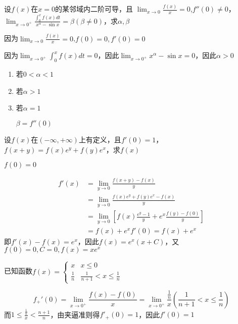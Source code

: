 \documentclass{article}
\begin{document}
\begin{examplle}[]
设\(f(x)\)在\(x=0\)的某邻域内二阶可导，且
\(\displaystyle\lim_{x\to0}\frac{f(x)}{x}=0\),\(f''(0)\neq0\)，
\(\displaystyle\lim_{x\to0^+}\frac{\int_0^xf(x)dt}{x^\alpha-\sin x}=\beta(\beta\neq0)\)，求\(\alpha,\beta\)

因为\(\lim_{x\to0}\frac{f(x)}{x}=0\),\(f(0)=0,f'(0)=0\)

因为\(\lim_{x\to0^+}\int_0^xf(x)dt=0\)，因此\(\lim_{x\to0^+}x^\alpha-\sin
  x=0\)，因此\(\alpha>0\)
\begin{enumerate}
\item 若\(0<\alpha<1\)
\item 若\(\alpha>1\)
\item 若\(\alpha=1\)

\(\beta=f''(0)\)
\end{enumerate}
\end{examplle}

\begin{examplle}[]
设\(f(x)\)在\((-\infty,+\infty)\)上有定义，且\(f'(0)=1\)，
\(f(x+y)=f(x)e^y+f(y)e^x\)，求\(f(x)\)

\(f(0)=0\)

\begin{align*}
f'(x)&=\lim_{y\to0}\frac{f(x+y)-f(x)}{y}\\
&=\lim_{y\to0}\frac{f(x)e^y+f(y)e^x-f(x)}{y}\\
&=\lim_{y\to0}\left[
f(x)\frac{e^y-1}{y}+e^x\frac{f(y)-f(0)}{y}
\right]\\
&=f(x)+e^xf'(0)=f(x)+e^x
\end{align*}
即\(f'(x)-f(x)=e^x\)，因此\(f(x)=e^x(x+C)\)，又\(f(0)=0,C=0,f(x)=xe^x\)
\end{examplle}

\begin{examplle}[]
已知函数\(\displaystyle f(x)=\begin{cases}x&x\le0\\\frac{1}{n}&\frac{1}{n+1}
  <x\le\frac{1}{n}\end{cases}\)

\begin{equation*}
f_+'(0)=\lim_{x\to0^+}\frac{f(x)-f(0)}{x}=\lim_{x\to0^+}\frac{\frac{1}{n}}{x}
\left(\frac{1}{n+1}<x\le\frac{1}{n}
\right)
\end{equation*}
而\(1\le\frac{\frac{1}{n}}{x}<\frac{n+1}{n}\)，由夹逼准则得\(f'_+(0)=1\)，因此\(f'(0)=1\)
\end{examplle}
\end{document}
